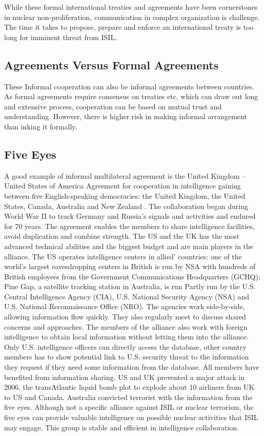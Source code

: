 \documentclass{report}
\begin{document}
While these formal international treaties and agreements have been cornerstones in nuclear non-proliferation, communication in complex organization is challenge.  The time it takes to propose, prepare and enforce an international treaty is too long for imminent threat from ISIL. 


\subsection{Agreements Versus Formal Agreements}

These Informal cooperation can also be informal agreements between countries. As formal agreements require consensus on treaties etc, which can draw out long and extensive process, cooperation can be based on mutual trust and understanding. However, there is higher risk in making informal arrangement than inking it formally. 

\subsection{Five Eyes}

A good example of informal multilateral agreement is the United Kingdom – United States of America Agreement for cooperation in intelligence gaining between five English-speaking democracies: the United Kingdom, the United States, Canada, Australia and New Zealand \cite{Cox2012}. The collaboration began during World War II to track Germany and Russia’s signals and activities and endured for 70 years. The agreement enables the members to share intelligence facilities, avoid duplication and combine strength. The US and the UK has the most advanced technical abilities and the biggest budget and are main players in the alliance. The US operates intelligence centers in allied’ countries: one of the world’s largest eavesdropping centers in British is run by NSA with hundreds of British employees from the Government Communications Headquarters (GCHQ); Pine Gap, a satellite tracking station in Australia, is run Partly run by the U.S. Central Intelligence Agency (CIA), U.S. National Security Agency (NSA) and U.S. National Reconnaissance Office (NRO). The agencies work side-by-side, allowing information flow quickly. They also regularly meet to discuss shared concerns and approaches. The members of the alliance also work with foreign intelligence to obtain local information without letting them into the alliance. Only U.S. intelligence officers can directly access the database, other country members has to show potential link to U.S. security threat to the information they request if they need some information from the database. All members have benefited from information sharing. US and UK prevented a major attack in 2006, the transAtlantic liquid bomb plot to explode about 10 airliners from UK to US and Canada. Australia convicted terrorist with the information from the five eyes. Although not a specific alliance against ISIL or nuclear terrorism, the five eyes can provide valuable intelligence on possible nuclear activities that ISIL may engage. This group is stable and efficient in intelligence collaboration. 
\end{document}
